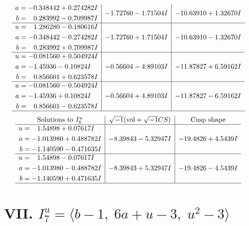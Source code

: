 \documentclass[1p]{elsarticle_modified}
\theoremstyle{definition}
\newcommand{\I}{\sqrt{-1}}
\begin{document}
$$\begin{array}{c|c|c}
\begin{aligned}
a &= -0.348442 + 0.274282 I \\
b &= \phantom{-}0.283992 - 0.709987 I\end{aligned}
 & -1.72760 - 1.71504 I & -10.63910 + 1.32670 I \\ \hline\begin{aligned}
u &= \phantom{-}1.286280 - 0.180616 I \\
a &= -0.348442 - 0.274282 I \\
b &= \phantom{-}0.283992 + 0.709987 I\end{aligned}
 & -1.72760 + 1.71504 I & -10.63910 - 1.32670 I \\ \hline\begin{aligned}
u &= -0.081560 + 0.504924 I \\
a &= -1.45936 - 0.10824 I \\
b &= \phantom{-}0.856601 + 0.623578 I\end{aligned}
 & -0.56604 - 4.89103 I & -11.87827 + 6.59162 I \\ \hline\begin{aligned}
u &= -0.081560 - 0.504924 I \\
a &= -1.45936 + 0.10824 I \\
b &= \phantom{-}0.856601 - 0.623578 I\end{aligned}
 & -0.56604 + 4.89103 I & -11.87827 - 6.59162 I\\
 \hline 
 \end{array}$$\newpage$$\begin{array}{c|c|c}  
\text{Solutions to }I^u_{6}& \I (\text{vol} + \sqrt{-1}CS) & \text{Cusp shape}\\
 \hline 
\begin{aligned}
u &= \phantom{-}1.54898 + 0.07617 I \\
a &= -1.013980 + 0.488782 I \\
b &= -1.140590 - 0.471635 I\end{aligned}
 & -8.39843 - 5.32947 I & -19.4826 + 4.5439 I \\ \hline\begin{aligned}
u &= \phantom{-}1.54898 - 0.07617 I \\
a &= -1.013980 - 0.488782 I \\
b &= -1.140590 + 0.471635 I\end{aligned}
 & -8.39843 + 5.32947 I & -19.4826 - 4.5439 I\\
 \hline 
 \end{array}$$\newpage\newpage\renewcommand{\arraystretch}{1}
\centering \section*{VII. $I^u_{7}= \langle b-1,\;6 a+u-3,\;u^2-3 \rangle$}
\end{document}
